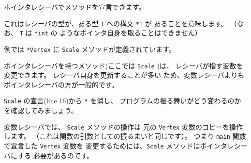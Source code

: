 ポインタレシーバでメソッドを宣言できます。

これはレシーバの型が、ある型 \texttt{T} への構文 \texttt{*T} が
あることを意味します。 （なお、 \texttt{T} は \texttt{*int} の
ようなポインタ自身を取ることはできません）

例では \texttt{*Vertex} に \texttt{Scale} メソッドが定義されています。

ポインタレシーバを持つメソッド(ここでは \texttt{Scale} )は、
レシーバが指す変数を変更できます。 レシーバ自身を更新することが多い
ため、変数レシーバよりもポインタレシーバの方が一般的です。

\texttt{Scale} の宣言(line 16)から \texttt{*} を消し、
プログラムの振る舞いがどう変わるのかを確認してみましょう。

変数レシーバでは、 \texttt{Scale} メソッドの操作は
元の \texttt{Vertex} 変数のコピーを操作します。 
（これは関数の引数としての振るまいと同じです）。 
つまり \texttt{main} 関数で宣言した \texttt{Vertex} 変数を
変更するためには、\texttt{Scale} メソッドはポインタレシーバにする
必要があるのです。